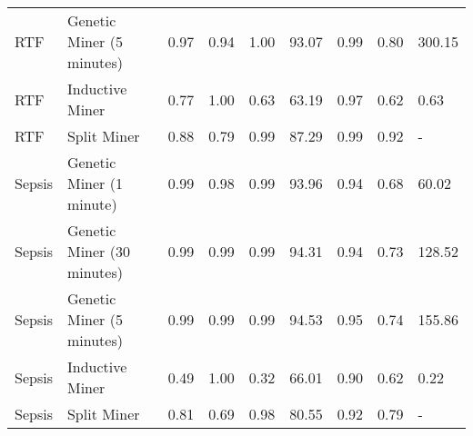 \begin{tabular}{llrrrrrrl}
RTF & Genetic Miner (5 minutes) & 0.97 & 0.94 & 1.00 & 93.07 & 0.99 & 0.80 & 300.15 \\
RTF & Inductive Miner & 0.77 & 1.00 & 0.63 & 63.19 & 0.97 & 0.62 & 0.63 \\
RTF & Split Miner & 0.88 & 0.79 & 0.99 & 87.29 & 0.99 & 0.92 & - \\
Sepsis & Genetic Miner (1 minute) & 0.99 & 0.98 & 0.99 & 93.96 & 0.94 & 0.68 & 60.02 \\
Sepsis & Genetic Miner (30 minutes) & 0.99 & 0.99 & 0.99 & 94.31 & 0.94 & 0.73 & 128.52 \\
Sepsis & Genetic Miner (5 minutes) & 0.99 & 0.99 & 0.99 & 94.53 & 0.95 & 0.74 & 155.86 \\
Sepsis & Inductive Miner & 0.49 & 1.00 & 0.32 & 66.01 & 0.90 & 0.62 & 0.22 \\
Sepsis & Split Miner & 0.81 & 0.69 & 0.98 & 80.55 & 0.92 & 0.79 & - \\
\bottomrule
\end{tabular}
